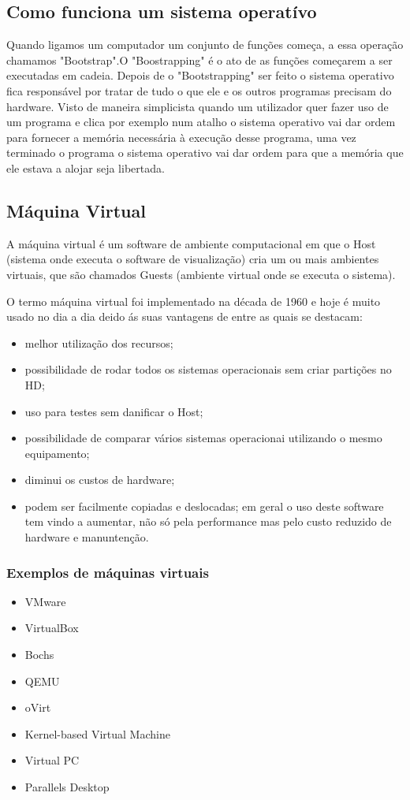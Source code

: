 \documentclass{report}
\begin{document}
\subsection{Como funciona um sistema operatívo}
Quando ligamos um computador um conjunto de funções começa, a essa operação chamamos "Bootstrap".O "Boostrapping" é o ato de as funções começarem a ser executadas em cadeia.
Depois de o "Bootstrapping" ser feito o sistema operativo fica responsável por tratar de tudo o que ele e os outros programas precisam do hardware.
Visto de maneira simplicista quando um utilizador quer fazer uso de um programa e clica por exemplo num atalho o sistema operativo vai dar ordem para fornecer a memória necessária à execução desse programa, uma vez terminado o programa  o sistema operativo vai dar ordem para que a memória que ele estava a alojar seja libertada.
\subsection{Máquina Virtual}
A máquina virtual é um software de ambiente computacional em que o Host (sistema onde executa o software de visualização) cria um ou mais ambientes virtuais, que são chamados Guests (ambiente virtual onde se executa o sistema).

O termo máquina virtual foi implementado na década de 1960 e hoje é muito usado no dia a dia deido ás suas vantagens de entre as quais se destacam:
\begin{itemize}
\item melhor utilização dos recursos;
\item possibilidade de rodar todos os sistemas operacionais sem criar partições no HD;
\item uso para testes sem danificar o Host;
\item possibilidade de comparar vários sistemas operacionai utilizando o mesmo equipamento;
\item diminui os custos de hardware;
\item podem ser facilmente copiadas e deslocadas;
em geral o uso deste software tem vindo a aumentar, não só pela performance mas pelo custo reduzido de hardware e manuntenção.
\end{itemize}
\subsubsection{Exemplos de máquinas virtuais}
\begin{itemize}
\item VMware
\item VirtualBox
\item Bochs
\item QEMU
\item oVirt
\item Kernel-based Virtual Machine
\item Virtual PC
\item Parallels Desktop
\end{itemize}
\end{document}
